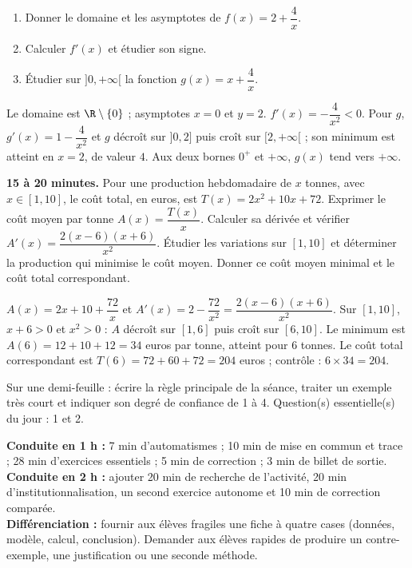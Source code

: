 \begin{exercise}[essentiel]
\begin{enumerate}\item Donner le domaine et les asymptotes de $f(x)=2+\dfrac{4}x$.\item Calculer $f'(x)$ et étudier son signe.\item Étudier sur $]0,+\infty[$ la fonction $g(x)=x+\dfrac{4}x$.\end{enumerate}
\end{exercise}
\begin{solution}Le domaine est $\R\setminus\{0\}$ ; asymptotes $x=0$ et $y=2$. $f'(x)=-\dfrac{4}{x^2}<0$. Pour $g$, $g'(x)=1-\dfrac{4}{x^2}$ et $g$ décroît sur $]0,2]$ puis croît sur $[2,+\infty[$ ; son minimum est atteint en $x=2$, de valeur $4$. Aux deux bornes $0^+$ et $+\infty$, $g(x)$ tend vers $+\infty$.\end{solution}


\begin{homework}\textbf{15 à 20 minutes.} Pour une production hebdomadaire de $x$ tonnes, avec $x\in[1,10]$, le coût total, en euros, est $T(x)=2x^2+10x+72$. Exprimer le coût moyen par tonne $A(x)=\dfrac{T(x)}x$. Calculer sa dérivée et vérifier $A'(x)=\dfrac{2(x-6)(x+6)}{x^2}$. Étudier les variations sur $[1,10]$ et déterminer la production qui minimise le coût moyen. Donner ce coût moyen minimal et le coût total correspondant.\end{homework}
\begin{solution}$A(x)=2x+10+\dfrac{72}{x}$ et $A'(x)=2-\dfrac{72}{x^2}=\dfrac{2(x-6)(x+6)}{x^2}$. Sur $[1,10]$, $x+6>0$ et $x^2>0$ : $A$ décroît sur $[1,6]$ puis croît sur $[6,10]$. Le minimum est $A(6)=12+10+12=34$ euros par tonne, atteint pour $6$ tonnes. Le coût total correspondant est $T(6)=72+60+72=204$ euros ; contrôle : $6\times34=204$.\end{solution}

\begin{exitticket}[3 minutes]Sur une demi-feuille : écrire la règle principale de la séance, traiter un exemple très court et indiquer son degré de confiance de 1 à 4. Question(s) essentielle(s) du jour : 1 et 2.\end{exitticket}

\ifmxteacher
\begin{method}
\textbf{Conduite en 1 h :} 7 min d'automatismes ; 10 min de mise en commun et trace ; 28 min d'exercices essentiels ; 5 min de correction ; 3 min de billet de sortie.\\
\textbf{Conduite en 2 h :} ajouter 20 min de recherche de l'activité, 20 min d'institutionnalisation, un second exercice autonome et 10 min de correction comparée.\\
\textbf{Différenciation :} fournir aux élèves fragiles une fiche à quatre cases (données, modèle, calcul, conclusion). Demander aux élèves rapides de produire un contre-exemple, une justification ou une seconde méthode.
\end{method}
\fi
